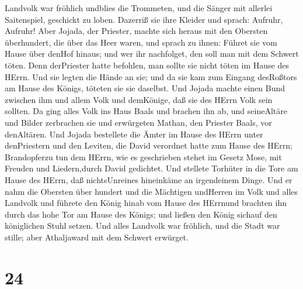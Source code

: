 Landvolk war fröhlich undblies die Trommeten, und die Sänger mit
allerlei Saitenspiel, geschickt zu loben. Dazerriß sie ihre Kleider und
sprach: Aufruhr, Aufruhr!  Aber Jojada, der Priester,
machte sich heraus mit den Obersten überhundert, die über das Heer
waren, und sprach zu ihnen: Führet sie vom Hause über denHof hinaus; und
wer ihr nachfolget, den soll man mit dem Schwert töten. Denn derPriester
hatte befohlen, man sollte sie nicht töten im Hause des HErrn.
 Und sie legten die Hände an sie; und da sie kam zum
Eingang desRoßtors am Hause des Königs, töteten sie sie daselbst.
 Und Jojada machte einen Bund zwischen ihm und allem Volk
und demKönige, daß sie des HErrn Volk sein sollten.  Da
ging alles Volk ins Haus Baals und brachen ihn ab, und seineAltäre und
Bilder zerbrachen sie und erwürgeten Mathan, den Priester Baals, vor
denAltären.  Und Jojada bestellete die Ämter im Hause des
HErrn unter denPriestern und den Leviten, die David verordnet hatte zum
Hause des HErrn; Brandopferzu tun dem HErrn, wie es geschrieben stehet
im Gesetz Mose, mit Freuden und Liedern,durch David gedichtet.
 Und stellete Torhüter in die Tore am Hause des HErrn, daß
nichtsUnreines hineinkäme an irgendeinem Dinge.  Und er
nahm die Obersten über hundert und die Mächtigen undHerren im Volk und
alles Landvolk und führete den König hinab vom Hause des HErrnund
brachten ihn durch das hohe Tor am Hause des Königs; und ließen den
König sichauf den königlichen Stuhl setzen.  Und alles
Landvolk war fröhlich, und die Stadt war stille; aber Athaljaward mit
dem Schwert erwürget.

\hypertarget{section-23}{%
\section{24}\label{section-23}}

